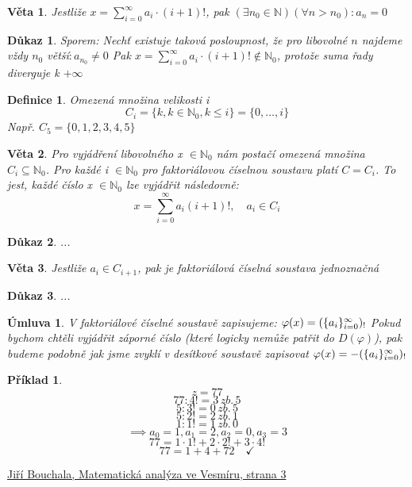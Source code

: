 \documentclass[12pt]{book}
\newtheorem{definice}{Definice}
\newtheorem{veta}{Věta}
\newtheorem*{pr}{Příklad}
\newtheorem*{dukaz}{Důkaz}
\newtheorem*{umluva}{Úmluva}
\begin{document}
\begin{veta}
	Jestliže $x=\sum_{i=0}^{\infty}a_i\cdot(i+1)!$, pak $(\exists n_0 \in \mathbb{N})(\forall n>n_0):a_n=0$
\end{veta}
\begin{dukaz}
	Sporem: \newline Nechť existuje taková posloupnost, že pro libovolné $n$ najdeme vždy $n_0$ větší$:a_{n_0}\ne0$\newline
	Pak $x=\sum_{i=0}^\infty a_i\cdot(i+1)! \notin \mathbb{N}_0$, protože suma řady diverguje k $+\infty$
	\end{dukaz}
\begin{definice}
	Omezená množina velikosti i\newline
	$$C_i=\{k,k\in\mathbb{N}_0,k\le i\}=\{0,\dots,i\}$$
	Např. $C_5 = \{0,1,2,3,4,5\}$
\end{definice}
\begin{veta}
	Pro vyjádření libovolného x $\in\mathbb{N}_0$ nám postačí omezená množina $C_i\subseteq\mathbb{N}_0$. Pro každé i $\in \mathbb{N}_0$ pro faktoriálovou číselnou soustavu platí $C=C_i$. To jest, každé číslo x $\in\mathbb{N}_0$ lze vyjádřit následovně:
	$$x=\sum_{i=0}^{\infty}a_i(i+1)!,\quad a_i\in C_i$$
\end{veta}
\begin{dukaz}
...
\end{dukaz}
\begin{veta}
	Jestliže $a_i \in C_{i+1}$, pak je faktoriálová číselná soustava jednoznačná
\end{veta}
\begin{dukaz}
	...
\end{dukaz}
\begin{umluva}
	V faktoriálové číselné soustavě zapisujeme:
	$\varphi(x) =  (\{a_i\}_{i=0}^{\infty})_!$\newline
	Pokud bychom chtěli vyjádřit záporné číslo (které logicky nemůže patřit do $D(\varphi)$), pak budeme podobně jak jsme zvyklí v desítkové soustavě zapisovat $\varphi(x) = - (\{a_i\}_{i=0}^{\infty})_!$
\end{umluva}

\begin{pr}
	$$z=77$$
	$$77:4!=3\,zb.\,5$$
	$$5:3!=0\,zb.\,5$$
	$$5:2!=2\,zb.\,1$$
	$$1:1!=1\,zb.\,0$$
	$$\implies a_0=1, a_1=2,a_2=0,a_3=3$$
	$$ 77 = 1 \cdot 1! + 2 \cdot 2! + 3\cdot 4!$$
	$$ 77 = 1 + 4 + 72 \quad \checkmark$$
\end{pr}


\begin{thebibliography}{2}
	 \href{https://homel.vsb.cz/~bou10/MA1/4.pdf}{Jiří Bouchala, Matematická analýza ve Vesmíru, strana 3}
\end{thebibliography}
\end{document}
